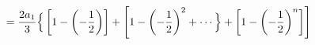 \documentclass[preview]{standalone}
\begin{document}
\begin{align*}
\special{dvisvgm:raw <g id='unique000'>}=\frac{2a_1}{3}\Big\{\left[1-\left(-\frac{1}{2}\right)\right]+\left[1-\left(-\frac{1}{2}\right)^2+\cdots\Big\} \special{dvisvgm:raw </g>}\special{dvisvgm:raw <g id='unique001'>}+\left[1-\left(-\frac{1}{2}\right)^n\right]\right]\special{dvisvgm:raw </g>}
\end{align*}
\end{document}
